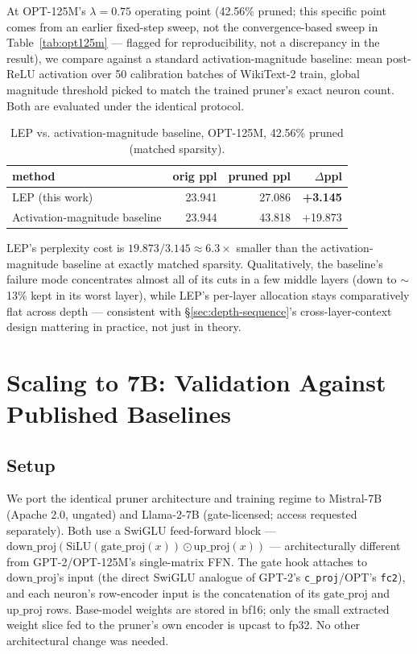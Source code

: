 \documentclass[11pt]{article}
\begin{document}
At OPT-125M's $\lambda = 0.75$ operating point (42.56\% pruned; this specific
point comes from an earlier fixed-step sweep, not the convergence-based
sweep in Table~\ref{tab:opt125m} --- flagged for reproducibility, not a discrepancy in the
result), we compare against a standard activation-magnitude baseline: mean
post-ReLU activation over 50 calibration batches of WikiText-2 train,
global magnitude threshold picked to match the trained pruner's exact
neuron count. Both are evaluated under the identical protocol.

\begin{table}[htbp]
\centering
\caption{LEP vs. activation-magnitude baseline, OPT-125M, 42.56\% pruned (matched sparsity).}
\label{tab:baseline}
\begin{tabular}{@{}lrrr@{}}
\toprule
method & orig ppl & pruned ppl & $\Delta$ppl \\
\midrule
LEP (this work) & 23.941 & 27.086 & \textbf{+3.145} \\
Activation-magnitude baseline & 23.944 & 43.818 & +19.873 \\
\bottomrule
\end{tabular}
\end{table}

LEP's perplexity cost is $19.873 / 3.145 \approx 6.3\times$ smaller than the
activation-magnitude baseline at exactly matched sparsity. Qualitatively,
the baseline's failure mode concentrates almost all of its cuts in a few
middle layers (down to $\sim$13\% kept in its worst layer), while LEP's
per-layer allocation stays comparatively flat across depth --- consistent with
\S\ref{sec:depth-sequence}'s cross-layer-context design mattering in practice, not just in theory.

\section{Scaling to 7B: Validation Against Published Baselines}
\label{sec:scaling-7b}

\subsection{Setup}

We port the identical pruner architecture and training regime to Mistral-7B
(Apache 2.0, ungated) and Llama-2-7B (gate-licensed; access requested
separately). Both use a SwiGLU feed-forward block ---
$\mathrm{down\_proj}(\mathrm{SiLU}(\mathrm{gate\_proj}(x)) \odot
\mathrm{up\_proj}(x))$ --- architecturally different from GPT-2/OPT-125M's
single-matrix FFN. The gate hook attaches to $\mathrm{down\_proj}$'s input
(the direct SwiGLU analogue of GPT-2's \texttt{c\_proj}/OPT's \texttt{fc2}), and each
neuron's row-encoder input is the concatenation of its $\mathrm{gate\_proj}$
and $\mathrm{up\_proj}$ rows. Base-model weights are stored in bf16; only the
small extracted weight slice fed to the pruner's own encoder is upcast to
fp32. No other architectural change was needed.
\end{document}
